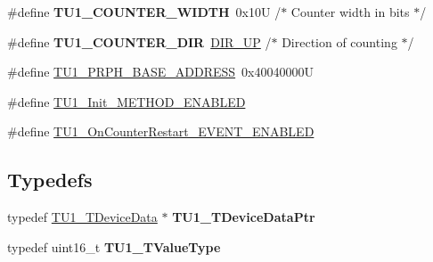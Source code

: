 \begin{DoxyCompactItemize}
\item 
\hypertarget{group___t_u1__module_ga1f7080987fb558b36a77447a61d7ec4a}{\#define {\bfseries T\-U1\-\_\-\-C\-O\-U\-N\-T\-E\-R\-\_\-\-W\-I\-D\-T\-H}~0x10\-U       /$\ast$ Counter width in bits  $\ast$/}\label{group___t_u1__module_ga1f7080987fb558b36a77447a61d7ec4a}

\item 
\hypertarget{group___t_u1__module_ga199a6b62d73e2782f77ac6c4f7a5ea41}{\#define {\bfseries T\-U1\-\_\-\-C\-O\-U\-N\-T\-E\-R\-\_\-\-D\-I\-R}~\hyperlink{group___p_e___types__module_gga89181fe4df1c4701239176768b4a9ce5a0b76fb863426c07c6c997a8d9523257b}{D\-I\-R\-\_\-\-U\-P}      /$\ast$ Direction of counting $\ast$/}\label{group___t_u1__module_ga199a6b62d73e2782f77ac6c4f7a5ea41}

\item 
\#define \hyperlink{group___t_u1__module_ga791d7a56f94f745b0dbb9a0ff09ee0d4}{T\-U1\-\_\-\-P\-R\-P\-H\-\_\-\-B\-A\-S\-E\-\_\-\-A\-D\-D\-R\-E\-S\-S}~0x40040000\-U
\item 
\#define \hyperlink{group___t_u1__module_ga2532ba47f579738a2f954e79d2d99e9d}{T\-U1\-\_\-\-Init\-\_\-\-M\-E\-T\-H\-O\-D\-\_\-\-E\-N\-A\-B\-L\-E\-D}
\item 
\#define \hyperlink{group___t_u1__module_ga776fe3d89696e57b98cf36b71dbcc86c}{T\-U1\-\_\-\-On\-Counter\-Restart\-\_\-\-E\-V\-E\-N\-T\-\_\-\-E\-N\-A\-B\-L\-E\-D}
\end{DoxyCompactItemize}
\subsection*{Typedefs}
\begin{DoxyCompactItemize}
\item 
\hypertarget{group___t_u1__module_ga992897b60934aa5b8d6edb262c3bba55}{typedef \hyperlink{struct_t_u1___t_device_data}{T\-U1\-\_\-\-T\-Device\-Data} $\ast$ {\bfseries T\-U1\-\_\-\-T\-Device\-Data\-Ptr}}\label{group___t_u1__module_ga992897b60934aa5b8d6edb262c3bba55}

\item 
\hypertarget{group___t_u1__module_ga10e196ba4fbf739bb461e1e9379ab405}{typedef uint16\-\_\-t {\bfseries T\-U1\-\_\-\-T\-Value\-Type}}\label{group___t_u1__module_ga10e196ba4fbf739bb461e1e9379ab405}

\end{DoxyCompactItemize}
